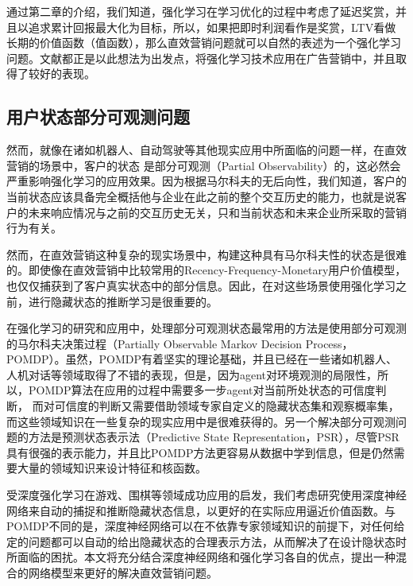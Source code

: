 通过第二章的介绍，我们知道，强化学习在学习优化的过程中考虑了延迟奖赏，并且以追求累计回报最大化为目标，所以，如果把即时利润看作是奖赏，LTV看做长期的价值函数（值函数），那么直效营销问题就可以自然的表述为一个强化学习问题。文献\citep{tkachenko2015autonomous,pednault2002sequential,silver2013concurrent}都正是以此想法为出发点，将强化学习技术应用在广告营销中，并且取得了较好的表现。

\subsection{用户状态部分可观测问题}
然而，就像在诸如机器人、自动驾驶等其他现实应用中所面临的问题一样，在直效营销的场景中，客户的状态
是部分可观测（Partial Observability）的，这必然会严重影响强化学习的应用效果。因为根据马尔科夫的无后向性，我们知道，客户的当前状态应该具备完全概括他与企业在此之前的整个交互历史的能力，也就是说客户的未来响应情况与之前的交互历史无关，只和当前状态和未来企业所采取的营销行为有关。

然而，在直效营销这种复杂的现实场景中，构建这种具有马尔科夫性的状态是很难的。即使像在直效营销中比较常用的Recency-Frequency-Monetary用户价值模型\citep{tkachenko2015autonomous}，也仅仅捕获到了客户真实状态中的部分信息。因此，在对这些场景使用强化学习之前，进行隐藏状态的推断学习是很重要的。

在强化学习的研究和应用中，处理部分可观测状态最常用的方法是使用部分可观测的马尔科夫决策过程（Partially Observable Markov  Decision Process，POMDP）\citep{kaelbling1998planning}。虽然，POMDP有着坚实的理论基础，并且已经在一些诸如机器人、人机对话等领域取得了不错的表现\citep{pineau2003point,williams2007partially}，但是，因为agent对环境观测的局限性，所以，POMDP算法在应用的过程中需要多一步agent对当前所处状态的可信度判断，
而对可信度的判断又需要借助领域专家自定义的隐藏状态集和观察概率集，而这些领域知识在一些复杂的现实应用中是很难获得的。另一个解决部分可观测问题的方法是预测状态表示法（Predictive State Representation，PSR）\citep{littman2002predictive}，尽管PSR具有很强的表示能力，并且比POMDP方法更容易从数据中学到信息，但是仍然需要大量的领域知识来设计特征和核函数。

受深度强化学习在游戏、围棋等领域\citep{mnih2013playing,mnih2015human}成功应用的启发，我们考虑研究使用深度神经网络来自动的捕捉和推断隐藏状态信息，以更好的在实际应用逼近价值函数。与POMDP不同的是，深度神经网络可以在不依靠专家领域知识的前提下，对任何给定的问题都可以自动的给出隐藏状态的合理表示方法\citep{deng2014deep}，从而解决了在设计隐状态时所面临的困扰。本文将充分结合深度神经网络和强化学习各自的优点，提出一种混合的网络模型来更好的解决直效营销问题。

